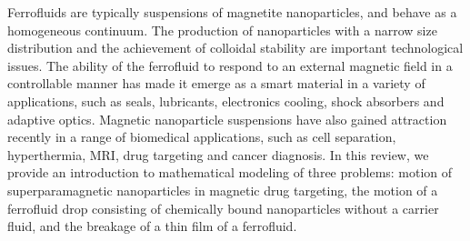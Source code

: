 Ferrofluids are typically suspensions of magnetite nanoparticles, and behave as a homogeneous continuum.  The production of nanoparticles with a  narrow size distribution and the achievement of colloidal stability are important technological issues.  The ability of the ferrofluid to respond to an external magnetic field in a controllable manner has made it emerge as a smart material in a variety of applications, such as
seals, lubricants, electronics cooling, shock absorbers and adaptive optics. Magnetic nanoparticle suspensions have also gained 
attraction recently in a  range of  biomedical applications, such as cell separation, hyperthermia, MRI, drug targeting and cancer diagnosis.
 In this review, we provide an introduction  to mathematical modeling of three problems:  motion of  superparamagnetic nanoparticles in magnetic drug targeting, the motion of a ferrofluid drop consisting of chemically bound nanoparticles without a carrier fluid, and the breakage of a thin film of a ferrofluid. 
 
 
